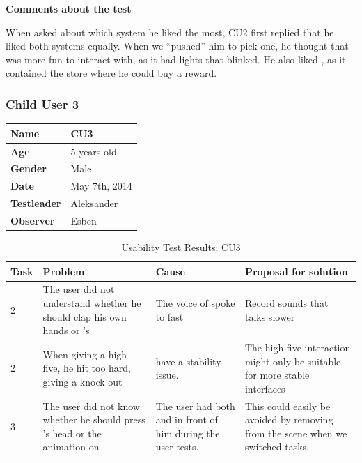 \textbf{Comments about the test}

When asked about which system he liked the most, CU2 first replied that he liked both systems equally. When we ``pushed'' him to pick one, he thought that \ab{} was more fun to interact with, as it had lights that blinked. He also liked \app{}, as it contained the store where he could buy a reward. 

\subsubsection{Child User 3}
\begin{table}[H]
\centering
\begin{tabular}{| p{4.0cm} | p{4.0cm} |}
\hline
 \textbf{Name} & CU3 \\
 \hline
 \textbf{Age} & 5 years old \\
 \hline 
 \textbf{Gender} & Male \\
 \hline
 \textbf{Date} & May 7th, 2014 \\
 \hline
 \textbf{Testleader} & Aleksander \\
 \hline
 \textbf{Observer} & Esben \\
 \hline
\end{tabular}
\end{table}


\begin{table}[H]
\centering
\begin{tabular}{| p{1.0cm} | p{4.0cm} | p{4.0cm} | p{4.0cm} |}
	\hline
	\textbf{Task} & \textbf{Problem} & \textbf{Cause} & \textbf{Proposal for solution} \\
	\hline
	2 & The user did not understand whether he should clap his own hands or \ab{}'s & The voice of \ab{} spoke to fast & Record sounds that talks slower \\
	\hline
	2 & When giving \ab{} a high five, he hit too hard, giving \ab{} a knock out & \ab{} have a stability issue. & The high five interaction might only be suitable for more stable interfaces \\
	\hline
	3 & The user did not know whether he should press \ab{}'s head or the animation on \app{} & The user had both \ab{} and \app{} in front of him during the user tests. & This could easily be avoided by removing \ab{} from the scene when we switched tasks. \\
	\hline  
\end{tabular}
\caption{Usability Test Results: CU3}
\label{tab:testchild3}
\end{table}

